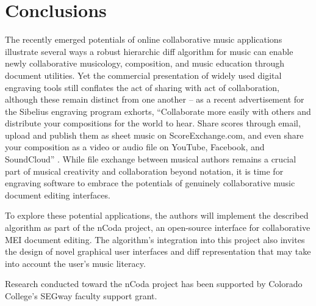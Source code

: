 \documentclass{article}
\begin{document}





\section{Conclusions}
The recently emerged potentials of online collaborative music applications illustrate several ways a robust hierarchic diff algorithm for music can enable newly collaborative musicology, composition, and music education through document utilities\cite{wust2001architectural,Martin:2015pb,McCulloch:2015pd,Flat:aa,Baca:2015xr}. Yet the commercial presentation of widely used digital engraving tools still conflates the act of sharing with act of collaboration, although these remain distinct from one another -- as a recent advertisement for the Sibelius engraving program exhorts, ``Collaborate more easily with others and distribute your compositions for the world to hear. Share scores through email, upload and publish them as sheet music on ScoreExchange.com, and even share your composition as a video or audio file on YouTube, Facebook, and SoundCloud'' \cite{Avid:to}. While file exchange between musical authors remains a crucial part of musical creativity and collaboration beyond notation, it is time for engraving software to embrace the potentials of genuinely collaborative music document editing interfaces. 

To explore these potential applications, the authors will implement the described algorithm as part of the nCoda project, an open-source interface for collaborative MEI document editing. The algorithm's integration into this project also invites the design of novel graphical user interfaces and diff representation that may take into account the user's music literacy.

%
\begin{acknowledgments}
Research conducted toward the nCoda project has been supported by Colorado College's SEGway faculty support grant.
\end{acknowledgments} 

\balance
\clearpage

\end{document}
